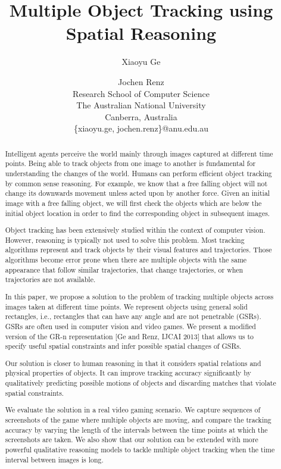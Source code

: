 \documentclass[letterpaper]{article}
\title{Multiple Object Tracking using Spatial Reasoning}
\author{Xiaoyu Ge \and Jochen Renz \\
Research School of Computer Science\\
The Australian National University \\
Canberra, Australia\\
\{xiaoyu.ge, jochen.renz\}@anu.edu.au
}
\begin{document}
\maketitle    
\begin{abstract}
Intelligent agents perceive the world mainly through images captured at  different time points. Being able to track objects from one image to another is fundamental for understanding the changes of the world. 
Humans can perform efficient object tracking by common sense reasoning. For example, we know that a free falling object will not change its downwards movement unless acted upon by another force. Given an initial image with a free falling object, we will first check the objects which are below the initial object location in order to find the corresponding object in subsequent images. 

Object tracking has been extensively studied within the context of computer vision. However, reasoning is typically not used to solve this problem. Most tracking algorithms represent and track objects by their visual features and trajectories. Those algorithms become error prone when there are multiple objects with the same appearance that follow similar trajectories, that change trajectories, or when trajectories are not available. 

In this paper, we propose a solution to the problem of tracking multiple objects across images taken at different time points. We represent objects using general solid rectangles, i.e., rectangles that can have any angle and are not penetrable (GSRs). GSRs are often used in computer vision and video games. We present a modified version of the GR-n representation [Ge and Renz, IJCAI 2013] that allows us to specify useful spatial constraints and infer possible spatial changes of GSRs. 

Our solution is closer to human reasoning in that it considers spatial relations and physical properties of objects. It can improve tracking accuracy significantly by qualitatively predicting possible motions of objects and discarding matches that violate spatial constraints. 

We evaluate the solution in a real video gaming scenario. We capture sequences of screenshots of the game where multiple objects are moving, and compare the tracking accuracy by varying the length of the intervals between the time points at which the screenshots are taken. We also show that our solution can be extended with more powerful qualitative reasoning models to tackle multiple object tracking when the time interval between images is long. 
\end{abstract}
\end{document}
